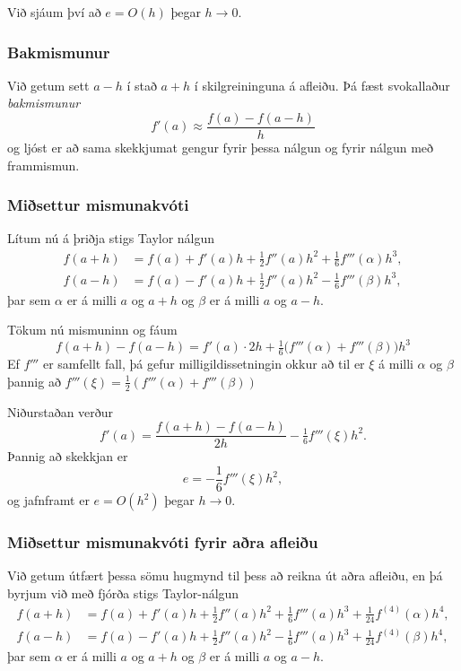 \documentclass[icelandic,a4paper,12pt]{article}
\begin{document}
Við sjáum því að $e=O(h)$ þegar $h \to 0$.



\subsubsection{Bakmismunur} 
Við getum sett $a-h$ í stað $a+h$ í skilgreininguna á afleiðu.
Þá fæst svokallaður {\em bakmismunur}
\begin{equation*}
  f'(a) \approx \frac{f(a)-f(a-h)}{h}
\end{equation*}
og ljóst er að sama skekkjumat gengur fyrir þessa nálgun
og fyrir nálgun með frammismun.



\subsubsection{Miðsettur mismunakvóti} 
Lítum nú á þriðja stigs Taylor nálgun 
\begin{align*}
  f(a+h)&=f(a)+f'(a)h+\tfrac 12 f''(a)h^2+\tfrac 16 f'''(\alpha)h^3,\\
  f(a-h)&=f(a)-f'(a)h+\tfrac 12 f''(a)h^2-\tfrac 16 f'''(\beta)h^3,
\end{align*}
þar sem $\alpha$ er á milli $a$ og $a+h$ og $\beta$ er á milli $a$ og
$a-h$.  

\pause
Tökum nú mismuninn og fáum
$$
f(a+h)-f(a-h)=f'(a)\cdot 2h+\tfrac 16\big(f'''(\alpha)+f'''(\beta)\big)h^3
$$
Ef  $f'''$ er samfellt fall, þá gefur
milligildis\-setningin okkur að til er $\xi$ á milli $\alpha$ og $\beta$
þannig að $f'''(\xi)=\tfrac 12 (f'''(\alpha)+f'''(\beta))$ 



Niðurstaðan verður 
$$
  f'(a)=\dfrac{f(a+h)-f(a-h)}{2h}-\tfrac 16f'''(\xi)h^2.
$$
Þannig að skekkjan er 
$$
  e = -\frac 16 f'''(\xi) h^2,
$$
og jafnframt er $e = O(h^2)$ þegar $h\to 0$.



\subsubsection{Miðsettur mismunakvóti fyrir aðra afleiðu} 
Við getum útfært þessa sömu hugmynd til þess að reikna út aðra
afleiðu, en þá byrjum við með fjórða stigs Taylor-nálgun 
\begin{align*}
  f(a+h)&=f(a)+f'(a)h+\tfrac 12 f''(a)h^2+\tfrac 16 f'''(a)h^3
+\tfrac 1{24}f^{(4)}(\alpha)h^4,\\
  f(a-h)&=f(a)-f'(a)h+\tfrac 12 f''(a)h^2-\tfrac 16 f'''(a)h^3
+\tfrac 1{24}f^{(4)}(\beta)h^4,
\end{align*}
þar sem $\alpha$ er á milli $a$ og $a+h$ og $\beta$ er á milli $a$ og
$a-h$.  
\end{document}
